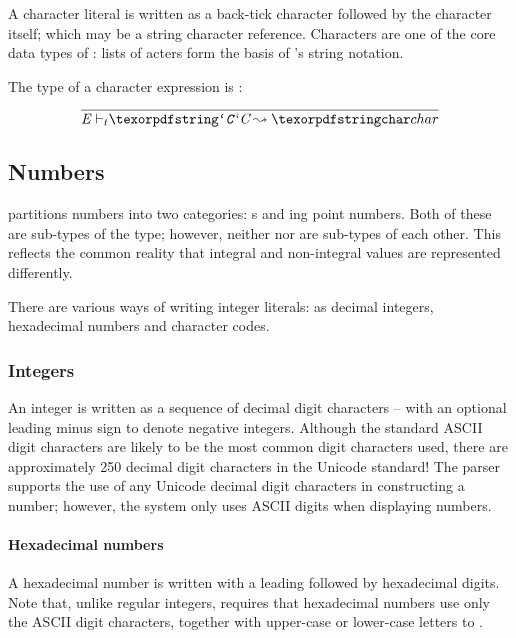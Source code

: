 A character literal is written as a back-tick character followed by the character itself; which may be a string character reference. Characters are one of the core data types of \go: lists of acters form the basis of \go's string notation.

The type of a character expression is :
\begin{equation}
\frac{}
{\typeprd{E}{\q{`\emph{C}}}\q{char}}
\end{equation}


\subsection{Numbers}
\label{expression:number}
\go partitions numbers into two categories: s and ing point numbers. Both of these are sub-types of the  type; however, neither  nor  are sub-types of each other. This reflects the common reality that integral and non-integral  values are represented differently.

There are various ways of writing integer literals: as decimal integers, hexadecimal numbers and character codes.

\subsubsection{Integers}
An integer is written as a sequence of decimal digit characters -- with an optional leading minus sign to denote negative integers. Although the standard ASCII digit characters are likely to be the most common digit characters used, there are approximately 250 decimal digit characters in the Unicode standard! The \go parser supports the use of any Unicode decimal digit characters in constructing a number; however, the \go system only uses ASCII digits when displaying numbers.

\paragraph{Hexadecimal numbers}
A hexadecimal number is written with a leading  followed by hexadecimal digits. Note that, unlike regular integers, \go requires that hexadecimal numbers use only the ASCII digit characters, together with upper-case or lower-case letters  to .


